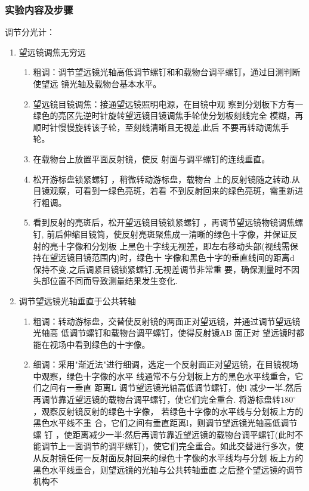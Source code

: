 \documentclass[dvipsnames, svgnames,a4paper,11pt]{article}
\begin{document}
\subsubsection{实验内容及步骤}
调节分光计：\begin{enumerate}
	\item 望远镜调焦无穷远\begin{enumerate}
		\item 粗调：调节望远镜光轴高低调节螺钉和和载物台调平螺钉，通过目测判断使望远
		镜光轴及载物台基本水平。
		\item 望远镜目镜调焦：接通望远镜照明电源，在目镜中观
		察到分划板下方有一绿色的亮区先逆时针旋转望远镜目镜调焦手轮使分划板刻线完全
		模糊，再顺时针慢慢旋转该子轮，至刻线清晰且无视差.此后
		不要再转动调焦手轮。
		\item 在载物台上放置平面反射镜，使反
		射面与调平螺钉的连线垂直。
		\item 松开游标盘锁紧螺钉 ，稍微转动游标盘，载物台
		上的反射镜随之转动.从目镜观察，可看到一绿色亮斑，若看
		不到反射回来的绿色亮斑，需重新进行粗调。
		\item 看到反射的亮斑后，松开望远镜目镜锁紧螺钉 ，再调节望远镜物镜调焦螺钉,
		前后伸缩目镜筒，使反射亮斑聚焦成一清晰的绿色十字像，并保证反射的亮十字像和分划板
		上黑色十字线无视差，即左右移动头部(视线需保持在望远镜目镜范围内)时，绿色十
		字像和黑色十字的垂直线间的距离d 保持不变.之后调紧目镜锁紧螺钉.无视差调节非常重
		要，确保测量时不因头部位置不同而导致测量结果发生变化.
	\end{enumerate}
	\item 调节望远镜光轴垂直于公共转轴\begin{enumerate}
		\item 粗调：转动游标盘，交替使反射镜的两面正对望远镜，并通过调节望远镜光轴高
		低调节螺钉和载物台调平螺钉，使得反射镜AB 面正对
		望远镜时都能在视场中看到绿色的十字像。
		\item 细调：采用"渐近法"进行细调，选定一个反射面正对望远镜，在目镜视场中观察，绿色十字像的水平
		线通常不与分划板上方的黑色水平线重合，它们之间有一垂直
		距离L 调节望远镜光轴高低调节螺钉，使l 减少一半.然后
		再调节靠近望远镜的载物台调平螺钉，使它们完全重合.
		将游标盘转$180^\circ$ ，观察反射镜反射的绿色十字像，
		若绿色十字像的水平线与分划板上方的黑色水平线不重
		合，它们之间有垂直距离l，则调节望远镜光轴高低调节螺
		钉 ，使距离减少一半:然后再调节靠近望远镜的载物台调平螺钉(此时不能调节上一面调节的调平螺钉)，使它们完全重合。如此交替进行多次，使从反射镜任何一反射面反射回来的绿色十字像的水平线均与分划
		板上方的黑色水平线重合，则望远镜的光轴与公共转轴垂直.之后整个望远镜的调节机构不

\end{enumerate}
\end{enumerate}
\end{document}
